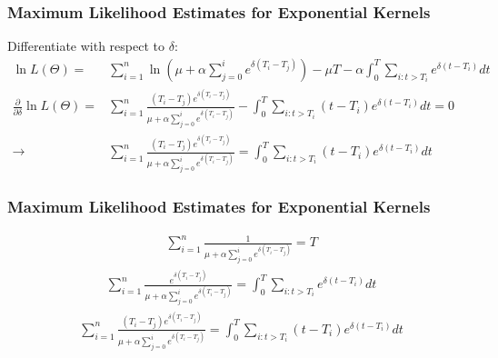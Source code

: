 \documentclass{beamer}
\begin{document}
\begin{frame}
\frametitle{Maximum Likelihood Estimates for Exponential Kernels}
Differentiate with respect to $\delta$:
\begin{equation*}
\begin{split}
\ln L(\Theta) = & \sum_{i=1}^n \ln (\mu + \alpha \sum_{j=0}^i  e^{\delta (T_i - T_j)}) - \mu T - \alpha \int_{0}^{T}  \sum_{i: t>T_i} e^{\delta (t - T_i)} dt \\
\frac{\partial}{\partial \delta} \ln L(\Theta) =& \sum_{i=1}^n \frac{(T_i - T_j)e^{\delta (T_i - T_j)}}{\mu + \alpha \sum_{j=0}^i e^{\delta (T_i - T_j)}} - \int_{0}^{T}  \sum_{i: t>T_i} (t - T_i)e^{\delta (t - T_i)} dt= 0\\
\to& \sum_{i=1}^n \frac{(T_i - T_j)e^{\delta (T_i - T_j)}}{\mu + \alpha \sum_{j=0}^i e^{\delta (T_i - T_j)}} = \int_{0}^{T}  \sum_{i: t>T_i} (t - T_i)e^{\delta (t - T_i)} dt
\end{split}
\end{equation*}
\end{frame}

\begin{frame}
\frametitle{Maximum Likelihood Estimates for Exponential Kernels}
\begin{equation}
\begin{split}
&\sum_{i=1}^n \frac{1}{\mu + \alpha \sum_{j=0}^i e^{\delta (T_i - T_j)}} = T
\end{split}
\end{equation}
\begin{equation}
\begin{split}
& \sum_{i=1}^n \frac{e^{\delta (T_i - T_j)}}{\mu + \alpha \sum_{j=0}^i e^{\delta (T_i - T_j)}} = \int_{0}^{T}  \sum_{i: t>T_i} e^{\delta (t - T_i)} dt
\end{split}
\end{equation}
\begin{equation}
\begin{split}
&\sum_{i=1}^n \frac{(T_i - T_j)e^{\delta (T_i - T_j)}}{\mu + \alpha \sum_{j=0}^i e^{\delta (T_i - T_j)}} = \int_{0}^{T}  \sum_{i: t>T_i} (t - T_i)e^{\delta (t - T_i)} dt
\end{split}
\end{equation}
\end{frame}
\end{document}
